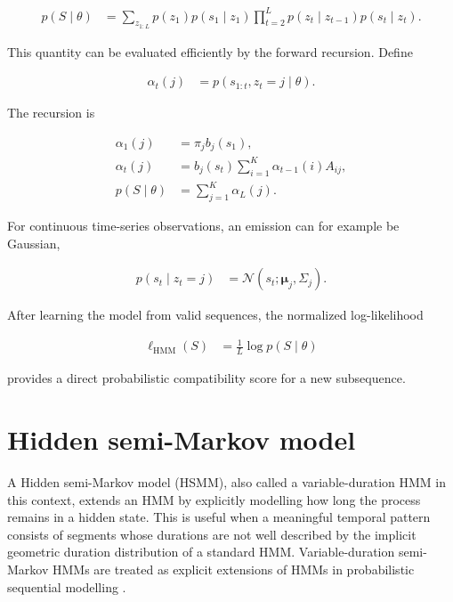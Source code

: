 \documentclass[a4paper]{article}
\begin{document}
        \begin{align}
            p(S\mid\theta)
            &=
            \sum_{z_{1:L}}
            p(z_1)
            p(s_1\mid z_1)
            \prod_{t=2}^{L}
            p(z_t\mid z_{t-1})
            p(s_t\mid z_t).
        \end{align}

        \noindent
        This quantity can be evaluated efficiently by the forward recursion. Define

        \begin{align}
            \alpha_t(j)
            &=
            p(s_{1:t},z_t=j\mid\theta).
        \end{align}

        \noindent
        The recursion is

        \begin{align}
            \alpha_1(j)
            &=
            \pi_j b_j(s_1),\\
            \alpha_t(j)
            &=
            b_j(s_t)
            \sum_{i=1}^{K}
            \alpha_{t-1}(i)A_{ij},\\
            p(S\mid\theta)
            &=
            \sum_{j=1}^{K}\alpha_L(j).
        \end{align}

        \noindent
        For continuous time-series observations, an emission can for example be Gaussian,

        \begin{align}
            p(s_t\mid z_t=j)
            &=
            \mathcal{N}
            \left(
            s_t;\boldsymbol{\mu}_j,\Sigma_j
            \right).
        \end{align}

        \noindent
        After learning the model from valid sequences, the normalized log-likelihood

        \begin{align}
            \ell_{\mathrm{HMM}}(S)
            &=
            \frac{1}{L}\log p(S\mid\theta)
        \end{align}

        \noindent
        provides a direct probabilistic compatibility score for a new subsequence.

    \section{Hidden semi-Markov model}

        A Hidden semi-Markov model (HSMM), also called a variable-duration HMM in this context, extends an HMM by explicitly modelling how long the process remains in a hidden state. This is useful when a meaningful temporal pattern consists of segments whose durations are not well described by the implicit geometric duration distribution of a standard HMM. Variable-duration semi-Markov HMMs are treated as explicit extensions of HMMs in probabilistic sequential modelling \cite{murphy-2002-dynamic-bayesian-networks-representation-inference-and-learning}.
\end{document}
